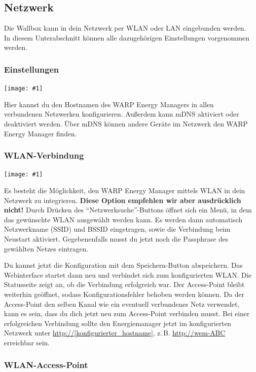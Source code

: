 \documentclass[a4paper,10pt]{article}
\newcommand{\gfx}[1]{\texttt{[image: \#1]}}
\begin{document}
\begin{multicols*}{2}
	\subsection{Netzwerk}
	\label{network}
	Die Wallbox kann in dein Netzwerk per WLAN oder LAN eingebunden werden.
	In diesem Unterabschnitt können alle dazugehörigen Einstellungen vorgenommen werden.

	\subsubsection{Einstellungen}

	\gfx{./img/resized/web_network}

	Hier kannst du den Hostnamen des WARP Energy Managers in allen verbundenen Netzwerken konfigurieren. Außerdem kann mDNS aktiviert oder deaktiviert werden.
	Über mDNS können andere Geräte im Netzwerk den WARP Energy Manager finden.


	\subsubsection{WLAN-Verbindung}
	\gfx{./img/resized/web_wifi_sta}

	Es besteht die Möglichkeit, den WARP Energy Manager mittels WLAN in dein Netzwerk
	zu integrieren. \textbf{Diese Option empfehlen wir aber ausdrücklich
	nicht!}
	Durch Drücken des \enquote{Netzwerksuche}-Buttons öffnet sich ein Menü, in dem das gewünschte WLAN ausgewählt werden kann.
	Es werden dann automatisch Netzwerkname (SSID) und BSSID eingetragen, sowie die Verbindung beim Neustart aktiviert.
	Gegebenenfalls musst du jetzt noch die Passphrase des gewählten Netzes eintragen.

	Du kannst jetzt die Konfiguration mit dem Speichern-Button abspeichern.
	Das Webinterface startet dann neu und verbindet sich zum konfigurierten WLAN. Die Statusseite zeigt
	an, ob die Verbindung erfolgreich war. Der Access-Point bleibt weiterhin
	geöffnet, sodass Konfigurationsfehler behoben werden können.
	Da der Access-Point den selben Kanal wie ein eventuell verbundenes Netz verwendet,
	kann es sein, dass du dich jetzt neu zum Access-Point verbinden musst. Bei einer erfolgreichen Verbindung sollte den Energiemanager jetzt im konfigurierten Netzwerk unter
	\url{http://[konfigurierter_hostname]}, z.\,B. \url{http://wem-ABC} erreichbar sein.

	\subsubsection{WLAN-Access-Point}


\end{multicols*}
\end{document}
